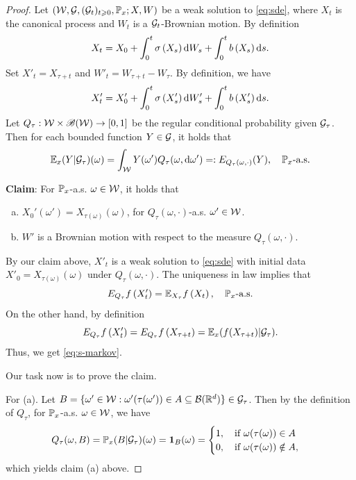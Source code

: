 \begin{proof}
    Let \(({\mathcal W}, {\mathcal G}, ({\mathcal G}_t)_{t\geqslant 0},{\mathbb P}_x; X, W)\) be a weak solution to \eqref{eq:sde}, where \(X_t\) is the canonical process and \(W_t\) is a \({\mathcal G}_t\)-Brownian motion. By definition 
    $$
        X_t=X_0+\int_0^t \sigma\left(X_s\right) \text{\rm{d}} W_s+\int_0^t b\left(X_s\right) \text{\rm{d}} s. 
    $$
    Set $X'_t=X_{\tau+t}$ and $W'_t=W_{\tau+t}-W_{\tau}$. By definition, we have 
    \begin{equation}
        X'_t=X'_0+\int_0^t \sigma\left(X'_s\right) \text{\rm{d}} W'_s+\int_0^t b\left(X'_s\right) \text{\rm{d}} s.
    \end{equation}
    Let $Q_\tau:{\mathcal W}\times {\mathscr B}({\mathcal W})\to [0,1]$ be the regular conditional probability given \({\mathcal G}_\tau\). Then for each bounded function \(Y\in {\mathcal G}\), it holds that 
    \begin{equation}
        {\mathbb E}_x(Y|{\mathcal G}_\tau)(\omega)= \int_{{\mathcal W}} Y(\omega') Q_\tau(\omega, \text{\rm{d}} \omega')=:E_{Q_\tau(\omega, \cdot)}(Y), \quad {\mathbb P}_x\mbox{-a.s}.
    \end{equation}\label{eq:RCP}
    \begin{framed}
	{\bf Claim}:  For \({\mathbb P}_x\)-a.s. \(\omega \in {\mathcal W}\), it holds that 
        \begin{enumerate}[(a)]
            \item $X_0'(\omega')=X_{\tau(\omega)}(\omega)$, for $Q_\tau(\omega,\cdot)$-a.s. \(\omega'\in {\mathcal W}\).  
            \item $W'$ is a Brownian motion with respect to the measure $Q_{\tau}(\omega, \cdot)$. 
        \end{enumerate}
    \end{framed}
    By our claim above, \(X'_t\) is a weak solution to \eqref{eq:sde} with initial data \(X'_0=X_{\tau(\omega)}(\omega)\) under \(Q_\tau(\omega,\cdot)\). The uniqueness in law implies that
    \[
        E_{Q_{\tau}} f\left(X'_t\right)=\mathbb{E}_{X_\tau} f\left(X_t\right), \quad {\mathbb P}_x\mbox{-a.s.}
    \]
    On the other hand, by definition 
    \[
        E_{Q_{\tau}} f\left(X'_t\right)= E_{Q_{\tau}} f\left(X_{\tau+t}\right)= {\mathbb E}_x(f(X_{\tau+t})|{\mathcal G}_{\tau}). 
    \]
    Thus, we get \eqref{eq:s-markov}. 
    
    Our task now is to prove the claim. 
    
    For (a). Let \(B=\{\omega'\in{\mathcal W}: \omega'(\tau(\omega'))\in A\subseteq {\mathcal B}({\mathbb R}^d)\}\in {\mathcal G}_\tau\). Then by the definition of \(Q_\tau\), for \({\mathbb P}_x\)-a.s. \(\omega\in {\mathcal W}\), we have  
    \begin{equation*}
        Q_\tau (\omega, B)= {\mathbb P}_x(B|{\mathcal G}_\tau)(\omega)={\mathbf{1}}_{B}(\omega)=
    \begin{cases}
        1, \quad \mbox{if } \omega(\tau(\omega))\in A\\
        0, \quad \mbox{if } \omega(\tau(\omega))\notin A, 
    \end{cases}
    \end{equation*}
    which yields claim (a) above. 


\end{proof}
